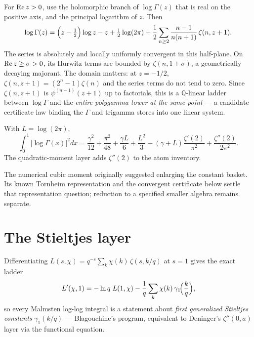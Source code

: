 \begin{result}\label{integral:res:hurwitzladder}
For $\operatorname{Re} z>0$, use the holomorphic branch of $\log\Gamma(z)$
that is real on the positive axis, and the principal logarithm of $z$. Then
\[
\log\Gamma(z)=\Bigl(z-\tfrac12\Bigr)\log z-z+\tfrac12\log(2\pi)
+\frac12\sum_{n\ge2}\frac{n-1}{n(n+1)}\,\zeta(n,z+1)
.
\]
The series is absolutely and locally uniformly convergent in this
half-plane. On $\operatorname{Re} z\ge\sigma>0$, its Hurwitz terms are bounded
by $\zeta(n,1+\sigma)$, a geometrically decaying majorant. The domain
matters: at $z=-1/2$, $\zeta(n,z+1)=(2^n-1)\zeta(n)$ and the
series terms do not tend to zero.
Since $\zeta(n,z+1)$ is $\psi^{(n-1)}(z+1)$ up to factorials, this is a
$\mathbb{Q}$-linear ladder between $\log\Gamma$ and the \emph{entire polygamma tower at
the same point} --- a candidate certificate law binding the $\Gamma$ and trigamma stores
into one linear system.
\end{result}

\begin{result}\label{integral:res:em}
With $L=\log(2\pi)$,
\[
\int_0^1\bigl[\log\Gamma(x)\bigr]^2dx
=\frac{\gamma^2}{12}+\frac{\pi^2}{48}+\frac{\gamma L}{6}+\frac{L^2}{3}
-(\gamma+L)\frac{\zeta'(2)}{\pi^2}+\frac{\zeta''(2)}{2\pi^2}
.
\]
The quadratic-moment layer adds $\zeta''(2)$ to the atom inventory.
\end{result}

The numerical cubic moment originally suggested enlarging the constant
basket. Its known Tornheim representation and the convergent certificate
below settle that representation question; reduction to a specified smaller
algebra remains separate.\label{integral:neg:cubic}





\section{The Stieltjes layer}\label{integral:sec:stieltjes}

Differentiating $L(s,\chi)=q^{-s}\sum_k\chi(k)\,\zeta(s,k/q)$ at $s=1$ gives the exact
ladder
\[
L'(\chi,1)=-\ln q\;L(1,\chi)-\frac1q\sum_k\chi(k)\,\gamma_1\!\Bigl(\frac{k}{q}\Bigr),
\]
so every Malmsten log-log integral is a statement about \emph{first generalized Stieltjes
constants} $\gamma_1(k/q)$ --- Blagouchine's program, equivalent to Deninger's
$\zeta''(0,a)$ layer via the functional equation.

